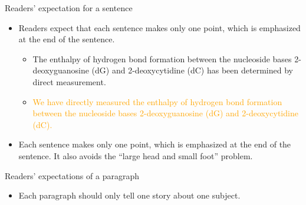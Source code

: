 \documentclass[
 size=14pt,
 paper=smartboard,  %
 mode=present, 		%
 display=slides, 	%
 style=tuliplab,  	%
 pauseslide,
 fleqn,leqno]{powerdot}{}
\begin{document}


\begin{slide}[toc=,bm=]{Readers' expectation for a sentence}
	\begin{itemize}
		\item Readers expect that each sentence makes only one point, which is emphasized at the end of the sentence.
			\begin{itemize}
				\item \textcolor{mygreen!50}{The enthalpy of hydrogen bond formation between the nucleoside bases 2-deoxyguanosine (dG) and 2-deoxycytidine (dC) has been determined by direct measurement.}
				\item \textcolor{orange}{We have directly measured the enthalpy of hydrogen bond formation between the nucleoside bases 2-deoxyguanosine (dG) and 2-deoxycytidine (dC).}
			\end{itemize}
		\item Each sentence makes only one point, which is emphasized at the end of the sentence. It also avoids the “large head and small foot” problem.	
	\end{itemize}
\end{slide}



\begin{slide}[toc=,bm=]{Readers’ expectations of a paragraph}
	\begin{itemize}
		\item Each paragraph should only tell one story about one subject.
	\end{itemize}
\end{slide}


\end{document}
